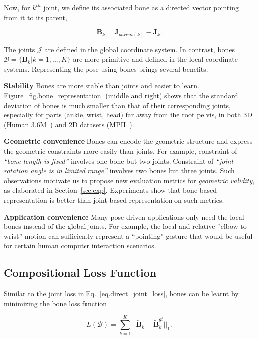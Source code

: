 \documentclass[10pt,twocolumn,letterpaper]{article}
\begin{document}
Now, for $k^{th}$ joint, we define its associated bone as a directed vector pointing from it to its parent,

\begin{equation}
\mathbf{B}_k = \mathbf{J}_{parent(k)} - \mathbf{J}_k.
\label{eq.bone_definition}
\end{equation}

The joints $\mathcal{J}$ are defined in the global coordinate system. In contrast, bones $\mathcal{B}=\{\mathbf{B}_k|k=1,...,K\}$ are more primitive and defined in the local coordinate systems. Representing the pose using bones brings several benefits.

\textbf{Stability} Bones are more stable than joints and easier to learn. Figure~\ref{fig.bone_representation} (middle and right) shows that the standard deviation of bones is much smaller than that of their corresponding joints, especially for parts (ankle, wrist, head) far away from the root pelvis, in both 3D (Human 3.6M~\cite{ionescu2014human3}) and 2D datasets (MPII~\cite{andriluka20142d}).

\textbf{Geometric convenience} Bones can encode the geometric structure and express the geometric constraints more easily than joints. For example, constraint of \emph{``bone length is fixed''} involves one bone but two joints. Constraint of \emph{``joint rotation angle is in limited range''} involves two bones but three joints. Such observations motivate us to propose new evaluation metrics for \emph{geometric validity}, as elaborated in Section~\ref{sec.exp}. Experiments show that bone based representation is better than joint based representation on such metrics.

\textbf{Application convenience} Many pose-driven applications only need the local bones instead of the global joints. For example, the local and relative ``elbow to wrist'' motion can sufficiently represent a ``pointing'' gesture that would be useful for certain human computer interaction scenarios.

\subsection{Compositional Loss Function}
\label{sec.compositional_loss}

Similar to the joint loss in Eq.~\eqref{eq.direct_joint_loss}, bones can be learnt by minimizing the bone loss function

\begin{equation}
L(\mathcal{B}) = \sum_{k=1}^K ||\tilde{\mathbf{B}}_k - \tilde{\mathbf{B}}_k^{gt}||_1.
\label{eq.direct_bone_loss}
\end{equation}
\end{document}
